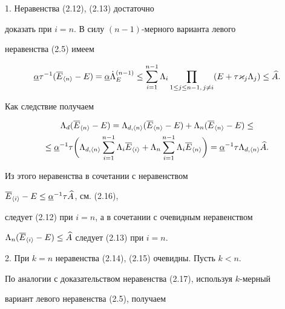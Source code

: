 \begin{pf} 1. Неравенства (2.12), (2.13) достаточно


доказать при $i=n$. В силу $(n-1)$-мерного варианта левого  


неравенства (2.5) имеем


\begin{equation}


\underline\alpha\tau^{-1}(\overline E_{\langle n\rangle}-E)=\underline\alpha


\Dot\Lambda_E^{(n-1)} \le \sum_{i=1}^{n-1}\Lambda_i


\prod_{1\le j\le n-1,\, j\ne i}(E+\tau\varkappa_j\Lambda_j)\le\aaa.


\end{equation}


Как следствие получаем


\begin{gather}


\Lambda_d(\overline E_{\langle n\rangle}-E)=


 \Lambda_{d,\langle n\rangle}(\overline E_{\langle n\rangle}-E)+


 \Lambda_n(\overline E_{\langle n\rangle}-E)\le \notag\\


\le\underline\alpha^{-1}\tau \biggl(\Lambda_{d,\langle n\rangle}


 \sum_{i=1}^{n-1}\Lambda_i \overline E_{\langle i\rangle}+


 \Lambda_n\sum_{i=1}^{n-1}\Lambda_i\overline E_{\langle n\rangle}\biggr)


=\underline\alpha^{-1}\tau\Lambda_{d,\langle n\rangle}\aaa.


\end{gather}


Из этого неравенства в сочетании с неравенством


$\overline E_{\langle i\rangle}-E\le\underline\alpha^{-1}\tau\widehat A$, см. (2.16),


следует (2.12) при $i=n$, а в сочетании с очевидным неравенством 


$\Lambda_n(\overline E_{\langle i\rangle}-E)\le\widehat A$ следует (2.13) при $i=n$.





2. При $k=n$ неравенства (2.14), (2.15) очевидны. Пусть $k<n$.


По аналогии с доказательством неравенства (2.17), используя $k$-мерный


вариант левого неравенства (2.5), получаем



\end{pf}
